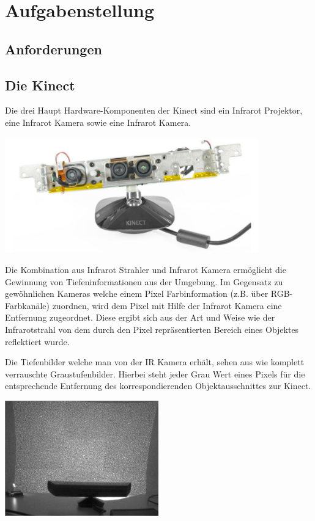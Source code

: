 \chapter{Aufgabenstellung}


\section{Anforderungen}
\section{Die Kinect}
Die drei Haupt Hardware-Komponenten der Kinect sind ein Infrarot Projektor, eine Infrarot Kamera sowie eine Infrarot Kamera.

\includegraphics[height=5cm]{Res/Kinect_Components.png}



Die Kombination aus Infrarot Strahler und Infrarot Kamera ermöglicht die Gewinnung von Tiefeninformationen aus der Umgebung. Im Gegensatz zu gewöhnlichen Kameras welche einem Pixel Farbinformation (z.B.  über RGB-Farbkanäle) zuordnen, wird dem Pixel mit Hilfe der Infrarot Kamera eine Entfernung zugeordnet. Diese ergibt sich aus der Art und Weise wie der Infrarotstrahl von dem durch den Pixel repräsentierten Bereich eines Objektes reflektiert wurde.

Die Tiefenbilder welche man von der IR Kamera erhält, sehen aus wie komplett verrauschte Graustufenbilder. Hierbei steht jeder Grau Wert eines Pixels für die entsprechende Entfernung des korrespondierenden Objektausschnittes zur Kinect.



\includegraphics[height=5cm]{Res/Kinect_9Points.png}



